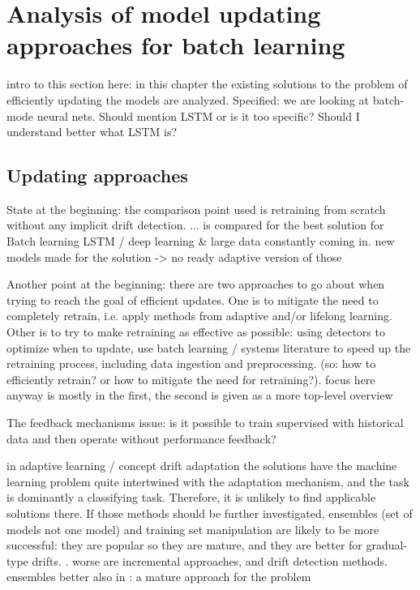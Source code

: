 \chapter{Analysis of model updating approaches for batch learning}

intro to this section here: in this chapter the existing solutions to the problem of efficiently updating the models are analyzed. Specified: we are looking at batch-mode neural nets. Should mention LSTM or is it too specific? Should I understand better what LSTM is?

\section{Updating approaches}

State at the beginning: the comparison point used is retraining from scratch without any implicit drift detection. ... is compared for the best solution for Batch learning LSTM / deep learning
& large data constantly coming in. new models made for the solution -> no ready adaptive version of those

Another point at the beginning: there are two approaches to go about when trying to reach the goal of efficient updates. One is to mitigate the need to completely retrain, i.e. apply methods from adaptive and/or lifelong learning. Other is to try to make retraining as effective as possible: using detectors to optimize when to update, use batch learning / systems literature to speed up the retraining process, including data ingestion and preprocessing. (so: how to efficiently retrain? or how to mitigate the need for retraining?). focus here anyway is mostly in the first, the second is given as a more top-level overview

The feedback mechanisms issue: is it possible to train supervised with historical data and then operate without performance feedback?

in adaptive learning / concept drift adaptation the solutions have the machine learning problem quite intertwined with the adaptation mechanism, and the task is dominantly a classifying task. Therefore, it is unlikely to find applicable solutions there. If those methods should be further investigated, ensembles (set of models not one model) and training set manipulation are likely to be more successful: they are popular so they are mature, and they are better for gradual-type drifts. \cite{zliobaite_driftsurvey}. worse are incremental approaches, and drift detection methods.
ensembles better also in  \cite{mlforstreamingsurvey}:
a mature approach for the problem


